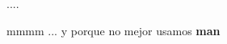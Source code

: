 \begin{frame}[c]{....}
  \begin{center}
    mmmm ... y porque no mejor usamos \textbf{man}
  \end{center}
\end{frame}

%
%

